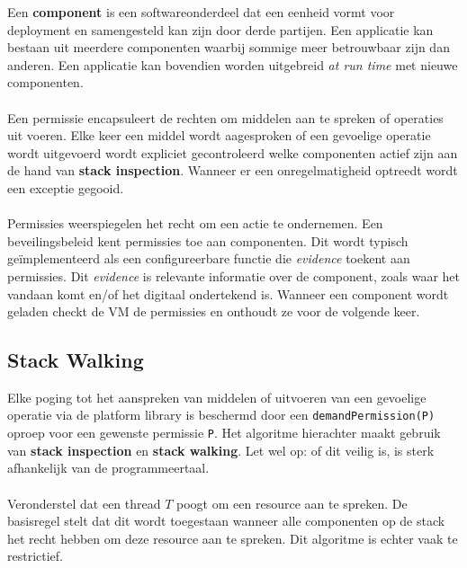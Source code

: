 \documentclass[../main.tex]{subfiles}
\begin{document}
Een \textbf{component} is een softwareonderdeel dat een eenheid vormt voor deployment en samengesteld kan zijn door derde partijen. Een applicatie kan bestaan uit meerdere componenten waarbij sommige meer betrouwbaar zijn dan anderen. Een applicatie kan bovendien worden uitgebreid \textit{at run time} met nieuwe componenten.
\\\\
Een permissie encapsuleert de rechten om middelen aan te spreken of operaties uit voeren. Elke keer een middel wordt aagesproken of een gevoelige operatie wordt uitgevoerd wordt expliciet gecontroleerd welke componenten actief zijn aan de hand van \textbf{stack inspection}. Wanneer er een onregelmatigheid optreedt wordt een exceptie gegooid.
\\\\
Permissies weerspiegelen het recht om een actie te ondernemen. Een beveilingsbeleid kent permissies toe aan componenten. Dit wordt typisch ge\"implementeerd als een configureerbare functie die \textit{evidence} toekent aan permissies. Dit \textit{evidence} is relevante informatie over de component, zoals waar het vandaan komt en/of het digitaal ondertekend is. Wanneer een component wordt geladen checkt de VM de permissies en onthoudt ze voor de volgende keer.


\subsection{Stack Walking}
Elke poging tot het aanspreken van middelen of uitvoeren van een gevoelige operatie via de platform library is beschermd door een \texttt{demandPermission(P)} oproep voor een gewenste permissie \texttt{P}. Het algoritme hierachter maakt gebruik van \textbf{stack inspection} en \textbf{stack walking}. Let wel op: of dit veilig is, is sterk afhankelijk van de programmeertaal.
\\\\
Veronderstel dat een thread $T$ poogt om een resource aan te spreken. De basisregel stelt dat dit wordt toegestaan wanneer alle componenten op de stack het recht hebben om deze resource aan te spreken. Dit algoritme is echter vaak te restrictief.
\end{document}

